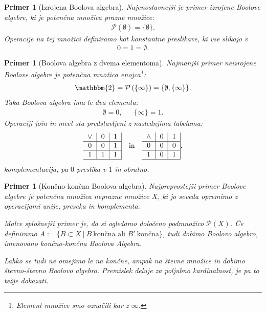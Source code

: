 \documentclass{amsart}
\newtheorem{primer}[izrek]{Primer}
\begin{document}
\begin{primer}[Izrojena Boolova algebra]
    Najenostavnejši je primer izrojene Boolove algebre, ki je potenčna množica prazne množice:
    \begin{align*}
        \mathcal{P}\left(\emptyset\right) = \{\emptyset\}.
    \end{align*}
    Operacije na tej množici definiramo kot konstantne preslikave, ki vse slikajo v \[0 = 1 = \emptyset.\]
\end{primer}

\begin{primer}[Boolova algebra z dvema elementoma]
    Najmanjši primer neizrojene Boolove algebre je potenčna množica enojca\footnote{Element množice smo označili kar z \(\infty\).}:
    \begin{align*}
        \mathbbm{2} = \mathcal{P}\left(\{\infty\}\right) = \{\emptyset, \{\infty\}\}.
    \end{align*}
    Taka Boolova algebra ima le dva elementa:
    \begin{align*}
        \emptyset = 0, && \{\infty\} = 1.
    \end{align*}
    Operaciji join in meet sta predstavljeni z naslednjima tabelama:
    \begin{align*}
    \begin{tabular}{c|c|c|}
        \(\vee\) & $0$ & $1$ \\
        \hline
        $0$ & \(0\) &$1$ \\
        \hline
        $1$ & \(1\) & $1$ \\
        \hline
    \end{tabular}&& \text{in} &&
    \begin{tabular}{c|c|c|}
        \(\wedge\) & $0$ & $1$ \\
        \hline
        $0$ & $0$ &$0$ \\
        \hline
        $1$ & $0$ & $1$ \\
        \hline
    \end{tabular},
\end{align*}
komplementacija, pa $0$ preslika v $1$ in obratno.
\end{primer}

\begin{primer}[Končno-končna Boolova algebra]
    Najpreprostejši primer Boolove algebre je potenčna množica neprazne množice \(X\), ki jo seveda opremimo z operacijami unije,
    preseka in komplementa. 
    
    Malce splošnejši primer je, da si ogledamo določeno podmnožico \(\mathcal{P}\left(X\right)\).
    Če definiramo \(A := \{B \subset X~|~B~\text{končna  ali } B'~\text{končna}\}\), tudi dobimo Boolovo algebro, imenovano
    končno-končna Boolova Algebra.

    Lahko se tudi ne omejimo le na končne, ampak na števne množice in dobimo števno-števno Boolovo algebro.
    Premislek deluje za poljubno kardinalnost, je pa to težje dokazati.
\end{primer}
\end{document}

